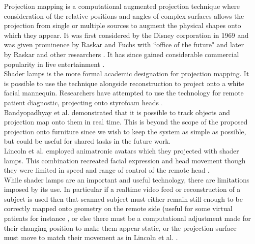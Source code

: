 Projection mapping is a computational augmented projection technique where consideration of the relative positions and angles of complex surfaces allows the projection from single or multiple sources to augment the physical shapes onto which they appear. It was first considered by the Disney corporation in 1969 \cite{projectionmappingweb2013} and was given prominence by Raskar and Fuchs with ``office of the future" \cite{Raskar1998} and later by Raskar and other researchers \cite{Low2001, Raskar2001a}. It has since gained considerable commercial popularity in live entertainment \cite{googleStatsProjectionMapping}.\\
                    Shader lamps \cite{Raskar2001a} is the more formal academic designation for projection mapping. It is possible to use the technique alongside reconstruction to project onto a white facial mannequin. Researchers have attempted to use the technology for remote patient diagnostic, projecting onto styrofoam heads  \cite{Rivera-Gutierrez2012}.\\          
                     Bandyopadhyay et al. demonstrated \cite{Bandyopadhyay} that it is possible to track objects and projection map \cite{Dalsgaard2011} onto them in real time. This is beyond the scope of the proposed projection onto furniture since we wish to keep the system as simple as possible, but could be useful for shared tasks in the future work.\\
                    Lincoln et al. employed animatronic avatars which they projected with shader lamps. This combination recreated facial expression and head movement though they were limited in speed and range of control of the remote head \cite{Lincoln:2010it}.\\
                    While shader lamps are an important and useful technology, there are limitations imposed by its use. In particular if a realtime video feed or reconstruction of a subject is used then that scanned subject must either remain still enough to be correctly mapped onto geometry on the remote side (useful for some virtual patients for instance \cite{Benjamin2012}, or else there must be a computational adjustment made for their changing position to make them appear static, or the projection surface must move to match their movement as in Lincoln et al. .
 
